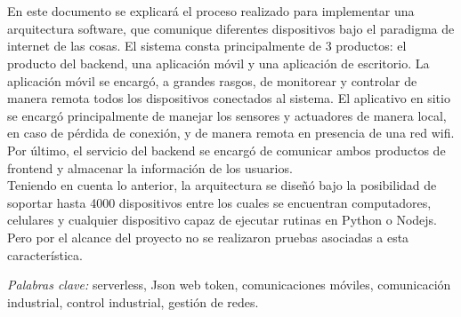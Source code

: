 

\section*{}

En este documento se explicará el proceso realizado para implementar una arquitectura software, que comunique diferentes dispositivos bajo el paradigma de internet de las cosas. El sistema consta principalmente de 3 productos: el producto del backend, una aplicación móvil y una aplicación de escritorio. La aplicación móvil se encargó, a grandes rasgos, de monitorear y controlar de manera remota todos los dispositivos conectados al sistema. El aplicativo en sitio se encargó principalmente de manejar los sensores y actuadores de manera local, en caso de pérdida de conexión, y de manera remota en presencia de una red wifi. Por último, el servicio del backend se encargó de comunicar ambos productos de frontend y almacenar la información de los usuarios.
\vspace{0.5cm}\\
Teniendo en cuenta lo anterior, la arquitectura se diseñó bajo la posibilidad de soportar hasta 4000 dispositivos entre los cuales se encuentran computadores, celulares y cualquier dispositivo capaz de ejecutar rutinas en Python o Nodejs. Pero por el alcance del proyecto no se realizaron pruebas asociadas a esta característica.
\begin{center}
	\textsl{Palabras clave:} serverless, Json web token, comunicaciones móviles, comunicación industrial, control industrial, gestión de redes.
\end{center}

\newpage

\section*{}

